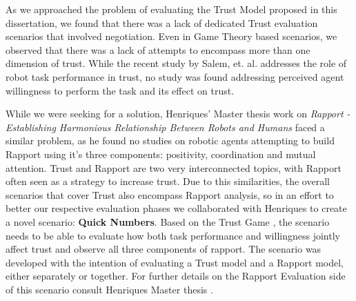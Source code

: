 \label{chap:Scenario}

As we approached the problem of evaluating the Trust Model proposed in this dissertation, we found that there was a lack of dedicated Trust evaluation scenarios that involved negotiation. Even in Game Theory based scenarios, we observed that there was a lack of attempts to encompass more than one dimension of trust. While the recent study by Salem, et. al.\cite{Salem2015b} addresses the role of robot task performance in trust, no study was found addressing perceived agent willingness to perform the task and its effect on trust. 

While we were seeking for a solution, Henriques' Master thesis work on \textit{Rapport - Establishing Harmonious Relationship Between Robots and Humans} \cite{Henriques2016} faced a similar problem, as he found no studies on robotic agents attempting to build Rapport using it's three components: positivity, coordination and mutual attention. Trust and Rapport are two very interconnected topics, with Rapport often seen as a strategy to increase trust. Due to this similarities, the overall scenarios that cover Trust also encompass Rapport analysis, so in an effort to better our respective evaluation phases we collaborated with Henriques to create a novel scenario: \textbf{Quick Numbers}. Based on the Trust Game \cite{JoyceBergJohnDickhaut}, the scenario needs to be able to evaluate how both task performance and willingness jointly affect trust and observe all three components of rapport. The scenario was developed with the intention of evaluating a Trust model and a Rapport model, either separately or together. For further details on the Rapport Evaluation side of this scenario consult Henriques Master thesis \cite{Henriques2016}.

